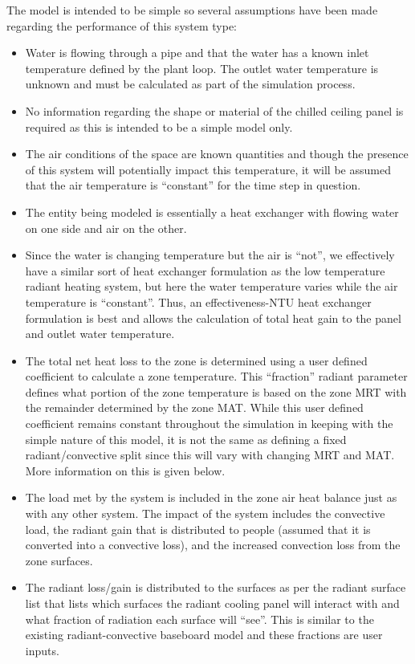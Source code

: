The model is intended to be simple so several assumptions have been made regarding the performance of this system type:

\begin{itemize}
\tightlist
\item
  Water is flowing through a pipe and that the water has a known inlet temperature defined by the plant loop.  The outlet water temperature is unknown and must be calculated as part of the simulation process.
\item
  No information regarding the shape or material of the chilled ceiling panel is required as this is intended to be a simple model only.
\item
  The air conditions of the space are known quantities and though the presence of this system will potentially impact this temperature, it will be assumed that the air temperature is “constant” for the time step in question.
\item
  The entity being modeled is essentially a heat exchanger with flowing water on one side and air on the other.
\item
  Since the water is changing temperature but the air is “not”, we effectively have a similar sort of heat exchanger formulation as the low temperature radiant heating system, but here the water temperature varies while the air temperature is “constant”.  Thus, an effectiveness-NTU heat exchanger formulation is best and allows the calculation of total heat gain to the panel and outlet water temperature.
\item
  The total net heat loss to the zone is determined using a user defined coefficient to calculate a zone temperature.  This “fraction” radiant parameter defines what portion of the zone temperature is based on the zone MRT with the remainder determined by the zone MAT.  While this user defined coefficient remains constant throughout the simulation in keeping with the simple nature of this model, it is not the same as defining a fixed radiant/convective split since this will vary with changing MRT and MAT.  More information on this is given below.
\item
  The load met by the system is included in the zone air heat balance just as with any other system.  The impact of the system includes the convective load, the radiant gain that is distributed to people (assumed that it is converted into a convective loss), and the increased convection loss from the zone surfaces.
\item
  The radiant loss/gain is distributed to the surfaces as per the radiant surface list that lists which surfaces the radiant cooling panel will interact with and what fraction of radiation each surface will “see”.  This is similar to the existing radiant-convective baseboard model and these fractions are user inputs.

\end{itemize}
